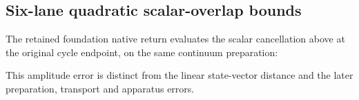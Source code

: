 \subsection{Six-lane quadratic scalar-overlap bounds}
\label{sec:foundation-evidence}
The retained foundation native return evaluates the scalar cancellation above
at the original cycle endpoint, on the same continuum preparation:
\begin{center}\end{center}
This amplitude error is distinct from the linear state-vector distance and
the later preparation, transport and apparatus errors.

